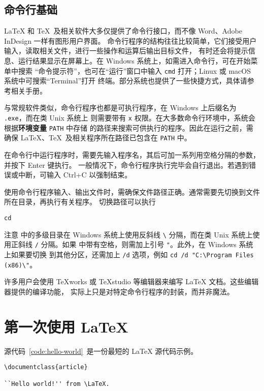 \subsection{命令行基础}

\LaTeX{} 和 \TeX\ 及相关软件大多仅提供了命令行接口，而不像 Word、Adobe InDesign 一样有图形用户界面。
命令行程序的结构往往比较简单，它们接受用户输入，读取相关文件，进行一些操作和运算后输出目标文件，
有时还会将提示信息、运行结果显示在屏幕上。在 Windows 系统上，如需进入命令行，可在开始菜单中搜索
“命令提示符”，也可在“运行”窗口中输入 \texttt{cmd} 打开；Linux 或 macOS 系统中可搜索“Terminal”打开
终端。部分系统也提供了一些快捷方式，具体请参考相关手册。

与常规软件类似，命令行程序也都是可执行程序，在 Windows 上后缀名为 \texttt{.exe}，而在类 Unix 系统上
则需要带有 \texttt{x} 权限。在大多数命令行环境中，系统会根据\textbf{环境变量} \texttt{PATH} 中存储
的路径来搜索可供执行的程序。因此在运行之前，需确保 \LaTeX 、\TeX\ 及相关程序所在路径已包含在
\texttt{PATH} 中。

在命令行中运行程序时，需要先输入程序名，其后可加一系列用空格分隔的参数，并按下 Enter 键执行。
一般情况下，命令行程序执行完毕会自行退出。若遇到错误或中断，可输入 Ctrl+C 以强制结束。

使用命令行程序输入、输出文件时，需确保文件路径正确。通常需要先切换到文件所在目录，再执行有关程序。
切换路径可以执行
\begin{command}
\verb|cd| 
\end{command}
注意  中的多级目录在 Windows 系统上使用反斜线 \verb|\| 分隔，而在类 Unix 系统上使用正斜线
\verb|/| 分隔。如果  中带有空格，则需加上引号 \verb|"|。此外，在 Windows 系统上如果要切换
到其他分区，还需加上 \verb|/d| 选项，例如 \verb|cd /d "C:\Program Files (x86)\"|。

许多用户会使用 TeXworks 或 TeXstudio 等编辑器来编写 \LaTeX{} 文档。这些编辑器提供的编译功能，
实际上只是对特定命令行程序的封装，而并非魔法。

\section{第一次使用 \LaTeX}\label{sec:run}

源代码~\ref{code:hello-world}~是一份最短的 \LaTeX{} 源代码示例。

\begin{sourcecode}[htp]
\begin{Verbatim}
\documentclass{article}

``Hello world!'' from \LaTeX.

\end{Verbatim}
\caption{\LaTeX{} 的一个最简单的源代码示例。}\label{code:hello-world}
\end{sourcecode}

